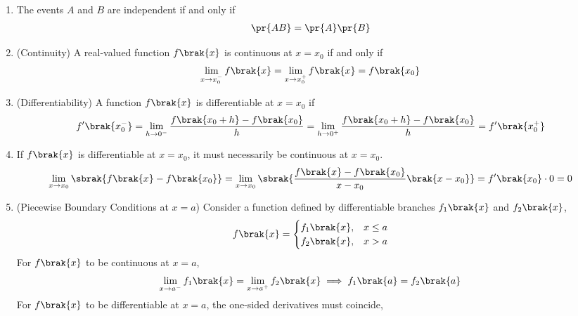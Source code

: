 \begin{enumerate}[label=\thesubsection.\arabic*, ref=\thesubsection.\theenumi]
\begin{align}
	\pr{E} = \sum_{n \in E}p_X\brak{n}
	\label{eq:EE26BTECH11229-event-pmf}
\end{align}
\item The events $A$ and $B$ are independent if and only if
\begin{align}
	\pr{AB} = \pr{A}\pr{B}
	\label{eq:EE26BTECH11229-indep}
\end{align}
\item (Continuity) A real-valued function $f\brak{x}$ is continuous at $x = x_0$ if and only if
\begin{align}
	\lim_{x \to x_0^-}f\brak{x} = \lim_{x \to x_0^+}f\brak{x} = f\brak{x_0}
	\label{eq:EE26BTECH11229-continuity}
\end{align}
\item (Differentiability) A function $f\brak{x}$ is differentiable at $x = x_0$ if
\begin{align}
	f^{\prime}\brak{x_0^-} = \lim_{h \to 0^-}\frac{f\brak{x_0 + h} - f\brak{x_0}}{h}
	= \lim_{h \to 0^+}\frac{f\brak{x_0 + h} - f\brak{x_0}}{h} = f^{\prime}\brak{x_0^+}
	\label{eq:EE26BTECH11229-diff-def}
\end{align}
\item If $f\brak{x}$ is differentiable at $x = x_0$, it must necessarily be continuous at $x = x_0$.
\\
\solution
\begin{align}
	\lim_{x \to x_0}\sbrak{f\brak{x} - f\brak{x_0}}
	= \lim_{x \to x_0}\sbrak{\frac{f\brak{x} - f\brak{x_0}}{x - x_0}\brak{x - x_0}}
	= f^{\prime}\brak{x_0}\cdot 0 = 0
	\label{eq:EE26BTECH11229-diff-cont}
\end{align}
\item (Piecewise Boundary Conditions at $x = a$) Consider a function defined by differentiable branches $f_1\brak{x}$ and $f_2\brak{x}$,
\begin{align}
	f\brak{x} = \begin{cases}
		f_1\brak{x}, & x \le a
		\\
		f_2\brak{x}, & x > a
	\end{cases}
\end{align}
For $f\brak{x}$ to be continuous at $x = a$,
\begin{align}
	\lim_{x \to a^-}f_1\brak{x} = \lim_{x \to a^+}f_2\brak{x} \implies f_1\brak{a} = f_2\brak{a}
	\label{eq:EE26BTECH11229-piecewise-cont}
\end{align}
For $f\brak{x}$ to be differentiable at $x = a$, the one-sided derivatives must coincide,
\begin{align}

\end{align}
\end{enumerate}
